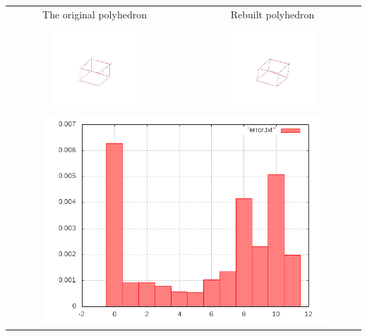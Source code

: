 \documentclass[11pt,fleqn,a4paper]{scrartcl}
\begin{document}
\begin{center}

\begin{tabular}{|c|c|}
\hline
The original polyhedron& Rebuilt polyhedron \\
\includegraphics[width=0.5\textwidth]{variant2/images/3/input.png} &
\includegraphics[width=0.5\textwidth]{variant2/images/3/out.png} \\
\midrule
\multicolumn{2}{|c|}{ \includegraphics[width=0.8\textwidth]{variant2/images/3/error.png}} \\
\hline
\end{tabular}
\end{center}
\end{document}
